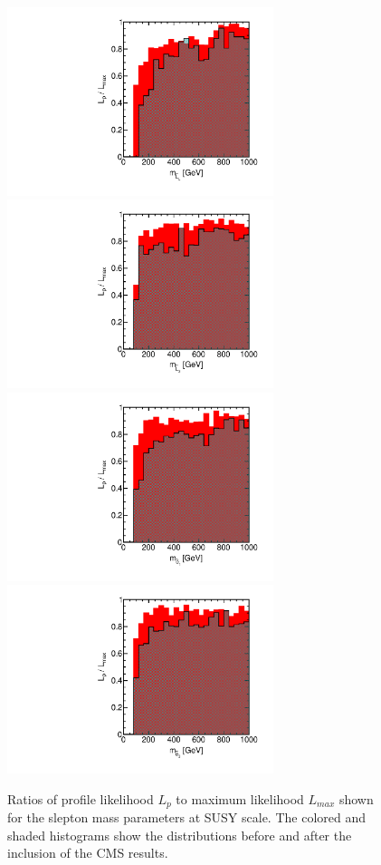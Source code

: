 \begin{figure}[htbp]
\begin{center}
\includegraphics[height=5.5cm]{figs/fig_m_L_L.pdf} 
\includegraphics[height=5.5cm]{figs/fig_m_L_3.pdf} \\
\includegraphics[height=5.5cm]{figs/fig_m_e_1.pdf}
\includegraphics[height=5.5cm]{figs/fig_m_e_3.pdf}
\caption{Ratios of profile likelihood $L_p$ to maximum likelihood $L_{max}$ shown for the slepton mass parameters at SUSY scale.  The colored and shaded histograms show the distributions before and after the inclusion of the CMS results.}
\label{fig:LRwcms_msl}
\end{center}
\end{figure}


